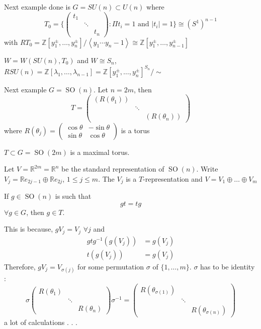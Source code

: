 \documentclass[11pt,a4paper]{scrarticle}
\theoremstyle{definition}
\theoremstyle{greenbox}
\newcommand{\R}{\mathbb{R}}
\newcommand{\Z}{\mathbb{Z}}
\begin{document}
\begin{example}
    Next example done is $ G = SU(n) \subset U(n)$ where 
    \[  T_{0} = \biggl\{\begin{pmatrix}t_{1} & & \\
    & \ddots & \\
    & & t_{n}\end{pmatrix} : \Pi t_{i} = 1 \text{ and } |t_{i}| = 1\biggr\}  \cong (S^{1})^{n-1}\]
    with $ RT_{0} = \Z[y_{1}^{\pm}, \dots, y_{n}^{\pm}] / \left< y_{1} \cdots y_{n} - 1 \right>  \cong \Z[y_{1}^{\pm}, \dots, y_{n-1}^{\pm}]$

    $ W = W(SU(n), T_{0}) $ and $ W \cong S_{n} $, $ RSU(n) = \Z[\lambda_{1}, \dots, \lambda_{n-1}] = \Z[y_{1}^{\pm}, \dots, y_{n}^{\pm}]^{S_{n}} / \sim $


    Next example $ G = \operatorname{SO}(n) $. Let $ n = 2m $, then 
    \[ T = \begin{pmatrix}
        (R(\theta_{1})) & & \\
        & \ddots & \\
        & & (R(\theta_{n}))
    \end{pmatrix} \]
    where $ R(\theta_{j}) = \begin{pmatrix}
        \cos \theta & - \sin \theta \\
        \sin \theta & \cos \theta
    \end{pmatrix} $ is a torus

    \begin{lemma}
        $ T \subset G = \operatorname{SO}(2m)  $ is a maximal torus. 
    \end{lemma}

    Let $ V = \R^{2m} = \R^{n}$ be the standard representation of $ \operatorname{SO}(n) $. Write $ V_{j} = \R e_{2j-1} \oplus \R e_{2j} $, $ 1 \le j \le m $. The $ V_{j} $ is a $ T $-representation and $ V = V_{1} \oplus \dots \oplus V_{m} $

    \begin{lemma}
        If $ g \in \operatorname{SO}(n) $   is such that 
        \[ gt = tg \]
        $ \forall g \in G $, then $ g \in T $. 
    \end{lemma}
    This is because, $ gV_{j} = V_{j} $ $ \forall j$ and \begin{align*}
        gtg^{-1}(g(V_{j})) & = g(V_{j}) \\
        t(g(V_{j})) & = g(V_{j})
    \end{align*}
    Therefore,  $ gV_{j} = V_{\sigma(j)} $ for some permutation $ \sigma $ of $ \{1, \dots, m\} $. $ \sigma $ has to be identity : 
    \[ \sigma \begin{pmatrix}
        R(\theta_{1}) & & \\
        & \ddots & \\
        & & R(\theta_{n})
    \end{pmatrix} \sigma^{-1} = \begin{pmatrix}
        R(\theta_{\sigma(1)}) & & \\
        & \ddots & \\
        & & R(\theta_{\sigma(n)})
    \end{pmatrix}\]
     a lot of calculations . . . 



\end{example}
\end{document}

